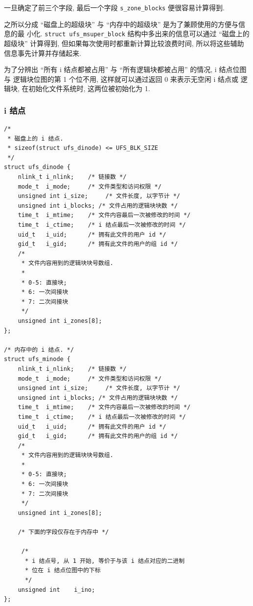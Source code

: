 \documentclass[nofonts, titlepage]{ctexart}
\begin{document}
一旦确定了前三个字段, 最后一个字段 \texttt{s\_zone\_blocks}
便很容易计算得到.

之所以分成 ``磁盘上的超级块'' 与 ``内存中的超级块''
是为了兼顾使用的方便与信息的最 小化. \texttt{struct ufs\_msuper\_block}
结构中多出来的信息可以通过 ``磁盘上的超级块'' 计算得到,
但如果每次使用时都重新计算比较浪费时间,
所以将这些辅助信息事先计算并存储起来.

为了分辨出 ``所有 i 结点都被占用'' 与 ``所有逻辑块都被占用'' 的情况, i
结点位图与 逻辑块位图的第 1 个位不用, 这样就可以通过返回 0 来表示无空闲
i 结点或 逻辑块, 在初始化文件系统时, 这两位被初始化为 1.

\subsubsection{i 结点}\label{i-ux7ed3ux70b9}

\begin{verbatim}
/*
 * 磁盘上的 i 结点.
 * sizeof(struct ufs_dinode) <= UFS_BLK_SIZE
 */
struct ufs_dinode {
    nlink_t i_nlink;    /* 链接数 */
    mode_t  i_mode;     /* 文件类型和访问权限 */
    unsigned int i_size;     /* 文件长度, 以字节计 */
    unsigned int i_blocks; /* 文件占用的逻辑块块数 */
    time_t  i_mtime;    /* 文件内容最后一次被修改的时间 */
    time_t  i_ctime;    /* i 结点最后一次被修改的时间 */
    uid_t   i_uid;      /* 拥有此文件的用户 id */
    gid_t   i_gid;      /* 拥有此文件的用户的组 id */
    /*
     * 文件内容用到的逻辑块块号数组.
     *
     * 0-5: 直接块;
     * 6: 一次间接块
     * 7: 二次间接块
     */
    unsigned int i_zones[8];
};

/* 内存中的 i 结点. */
struct ufs_minode {
    nlink_t i_nlink;    /* 链接数 */
    mode_t  i_mode;     /* 文件类型和访问权限 */
    unsigned int i_size;     /* 文件长度, 以字节计 */
    unsigned int i_blocks; /* 文件占用的逻辑块块数 */
    time_t  i_mtime;    /* 文件内容最后一次被修改的时间 */
    time_t  i_ctime;    /* i 结点最后一次被修改的时间 */
    uid_t   i_uid;      /* 拥有此文件的用户 id */
    gid_t   i_gid;      /* 拥有此文件的用户的组 id */
    /*
     * 文件内容用到的逻辑块块号数组.
     *
     * 0-5: 直接块;
     * 6: 一次间接块
     * 7: 二次间接块
     */
    unsigned int i_zones[8];

    /* 下面的字段仅存在于内存中 */

     /*
      * i 结点号, 从 1 开始, 等价于与该 i 结点对应的二进制
      * 位在 i 结点位图中的下标
      */
    unsigned int    i_ino;    
};
\end{verbatim}
\end{document}

